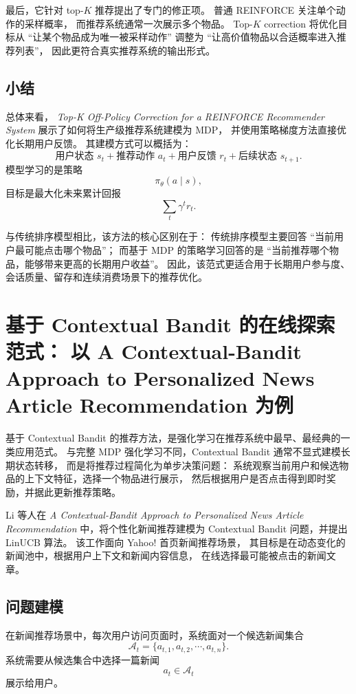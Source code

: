 \documentclass[11pt]{ctexart}
\begin{document}
最后，它针对 top-$K$ 推荐提出了专门的修正项。
普通 REINFORCE 关注单个动作的采样概率，
而推荐系统通常一次展示多个物品。
Top-$K$ correction 将优化目标从
``让某个物品成为唯一被采样动作''
调整为
``让高价值物品以合适概率进入推荐列表''，
因此更符合真实推荐系统的输出形式。

\subsection{小结}

总体来看，
\textit{Top-K Off-Policy Correction for a REINFORCE Recommender System}
展示了如何将生产级推荐系统建模为 MDP，
并使用策略梯度方法直接优化长期用户反馈。
其建模方式可以概括为：
\[
\text{用户状态 }s_t
+
\text{推荐动作 }a_t
+
\text{用户反馈 }r_t
+
\text{后续状态 }s_{t+1}.
\]
模型学习的是策略
\[
\pi_{\theta}(a\mid s),
\]
目标是最大化未来累计回报
\[
\sum_t \gamma^t r_t.
\]

与传统排序模型相比，该方法的核心区别在于：
传统排序模型主要回答
``当前用户最可能点击哪个物品''；
而基于 MDP 的策略学习回答的是
``当前推荐哪个物品，能够带来更高的长期用户收益''。
因此，该范式更适合用于长期用户参与度、会话质量、留存和连续消费场景下的推荐优化。

\section{基于 Contextual Bandit 的在线探索范式：
以 A Contextual-Bandit Approach to Personalized News Article Recommendation 为例}

基于 Contextual Bandit 的推荐方法，是强化学习在推荐系统中最早、最经典的一类应用范式。
与完整 MDP 强化学习不同，Contextual Bandit 通常不显式建模长期状态转移，
而是将推荐过程简化为单步决策问题：
系统观察当前用户和候选物品的上下文特征，选择一个物品进行展示，
然后根据用户是否点击得到即时奖励，并据此更新推荐策略。

Li 等人在
\textit{A Contextual-Bandit Approach to Personalized News Article Recommendation}
中，将个性化新闻推荐建模为 Contextual Bandit 问题，并提出 LinUCB 算法。
该工作面向 Yahoo! 首页新闻推荐场景，
其目标是在动态变化的新闻池中，根据用户上下文和新闻内容信息，
在线选择最可能被点击的新闻文章。

\subsection{问题建模}

在新闻推荐场景中，每次用户访问页面时，系统面对一个候选新闻集合
\[
\mathcal{A}_t=\{a_{t,1},a_{t,2},\cdots,a_{t,n}\}.
\]
系统需要从候选集合中选择一篇新闻
\[
a_t\in\mathcal{A}_t
\]
展示给用户。
\end{document}
